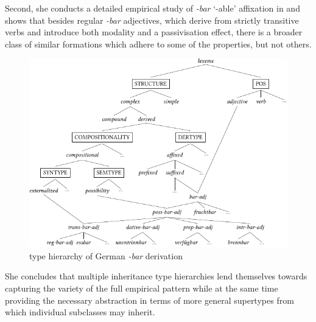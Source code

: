\documentclass[output=paper
	        ,collection
	        ,collectionchapter
 	        ,biblatex
                ,babelshorthands
                ,newtxmath
                ,draftmode
                ,colorlinks, citecolor=brown
]{langscibook}
\begin{document}
Second, she conducts a detailed empirical study of \textit{-bar}
`-able' affixation in  and shows that besides regular
\textit{-bar} adjectives, which derive from strictly transitive verbs and
introduce both modality and a  passivisation effect, there is a 
broader class of similar formations which adhere to some of the
properties, but not others.%

\begin{figure}[htb]
  \centering
  \includegraphics[scale=1.15]{figures/Riehemann-crop.pdf}
  
  \caption{ type hierarchy of German
    \textit{-bar} derivation}
  \label{fig:Riehemann}
\end{figure}

She concludes that multiple inheritance type hierarchies lend
themselves towards capturing the variety of the full empirical pattern
while at the same time providing the necessary abstraction in terms of
more general supertypes from which individual subclasses may inherit. 




\end{document}
